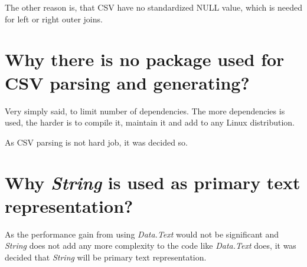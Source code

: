 The other reason is, that CSV have no standardized NULL value, which is needed for left or right outer joins.

\section{Why there is no package used for CSV parsing and generating?}
Very simply said, to limit number of dependencies. The more dependencies is used, the harder is to compile it, maintain it and add to any Linux distribution.

As CSV parsing is not hard job, it was decided so.

\section{Why \textit{String} is used as primary text representation?}
As the performance gain from using \textit{Data.Text} would not be significant and \textit{String} does not add any more complexity to the code like \textit{Data.Text} does, 
it was decided that \textit{String} will be primary text representation.

